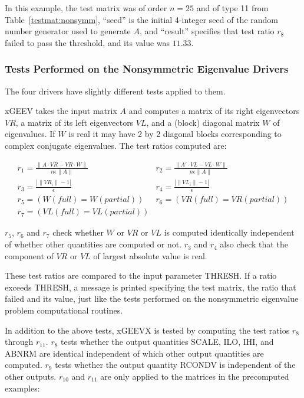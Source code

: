 \noindent
In this example, the test matrix was of order $n = 25$
and of type 11 from Table~\ref{testmat:nonsymm}, 
``seed'' is the initial 4-integer seed of the random number generator
used to generate $A$, and
``result'' specifies that test ratio $r_8$ failed to pass the
threshold, and its value was $11.33$.

\subsubsection{Tests Performed on the Nonsymmetric Eigenvalue Drivers}

\dent
The four drivers have slightly different tests applied to them.

xGEEV takes the input matrix $A$ and computes a matrix of its
right eigenvectors $VR$, a matrix of its left eigenvectors $VL$,
and a (block) diagonal matrix $W$ of eigenvalues. If $W$ is real
it may have 2 by 2 diagonal blocks corresponding to complex conjugate
eigenvalues. The test ratios computed are:
 
\begin{displaymath}
\begin{array}{ll}
r_1 = \frac{\|A \cdot VR - VR \cdot W \|}{n \epsilon \|A\|} &
r_2 = \frac{\|A' \cdot VL - VL \cdot W \|}{n \epsilon \|A\|} \\
r_3 = \frac{|\|VR_i \| -1|}{\epsilon} &
r_4 = \frac{|\|VL_i \| -1|}{\epsilon} \\
r_5 = ( W(full) = W(partial) ) &
r_6 = ( VR(full) = VR(partial) ) \\
r_7 = ( VL(full) = VL(partial) )
\end{array}
\end{displaymath}

$r_5$, $r_6$ and $r_7$ check whether $W$ or $VR$ or $VL$ is computed
identically independent of whether other quantities are computed or not.
$r_3$ and $r_4$ also check that the component of $VR$ or $VL$ of largest
absolute value is real.

These test ratios are compared to the input parameter THRESH. If a
ratio
exceeds THRESH, a message is printed specifying the test matrix, the
ratio that failed and its value, just like the tests performed on the
nonsymmetric eigenvalue problem computational routines.

In addition to the above tests, xGEEVX is tested by computing the test
ratios $r_8$ through $r_{11}$. $r_8$ tests whether the output quantities
SCALE, ILO, IHI, and ABNRM are identical independent of which
other
output quantities are computed. $r_9$ tests whether the output
quantity RCONDV is independent of the other outputs.
$r_{10}$ and $r_{11}$ are only applied to the matrices in the
precomputed
examples:

